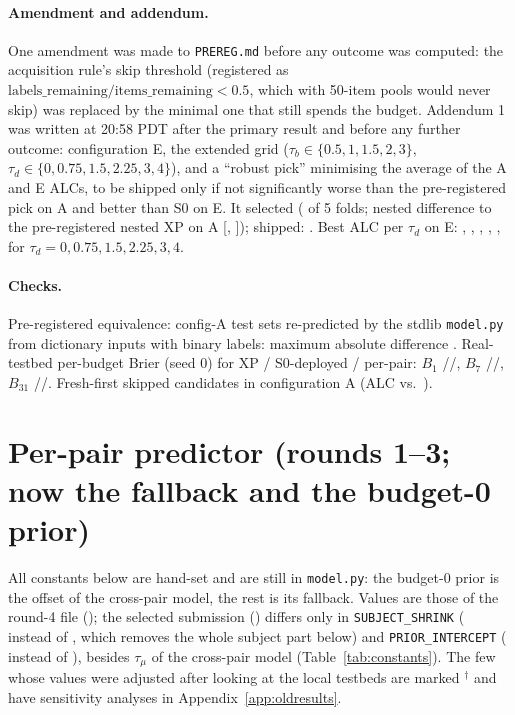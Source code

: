 \documentclass{article}
\begin{document}
\paragraph{Amendment and addendum.} One amendment was made to \texttt{PREREG.md} before any outcome was computed: the acquisition rule's skip threshold (registered as $\text{labels\_remaining}/\text{items\_remaining}<0.5$, which with 50-item pools would never skip) was replaced by the minimal one that still spends the budget. Addendum 1 was written at 20:58 PDT after the primary result and before any further outcome: configuration E, the extended grid ($\tau_b\in\{0.5,1,1.5,2,3\}$, $\tau_d\in\{0,0.75,1.5,2.25,3,4\}$), and a ``robust pick'' minimising the average of the A and E ALCs, to be shipped only if not significantly worse than the pre-registered pick on A and better than S0 on E. It selected \XpRobSameAsPrereg{} (\XpRobNFoldsSame{} of 5 folds; nested difference to the pre-registered nested XP on A \XpCARobVsPreMean{} [\XpCARobVsPreLo, \XpCARobVsPreHi]); shipped: \XpShipSource. Best ALC per $\tau_d$ on E: \XpProfItemZeroE, \XpProfItemZeroSevenFiveE, \XpProfItemOneFiveE, \XpProfItemTwoTwoFiveE, \XpProfItemThreeE, \XpProfItemFourE{} for $\tau_d=0,0.75,1.5,2.25,3,4$.

\paragraph{Checks.} Pre-registered equivalence: \XpEquivNTestsets{} config-A test sets re-predicted by the stdlib \texttt{model.py} from dictionary inputs with binary labels: maximum absolute difference \XpEquivMaxDiff. Real-testbed per-budget Brier (seed 0) for XP / S0-deployed / per-pair: $B_1$ \XpRealXpBOne/\XpRealShipGlobalBOne/\XpRealShipPerPairBOne, $B_7$ \XpRealXpBSeven/\XpRealShipGlobalBSeven/\XpRealShipPerPairBSeven, $B_{31}$ \XpRealXpBThirtyOne/\XpRealShipGlobalBThirtyOne/\XpRealShipPerPairBThirtyOne. Fresh-first skipped \XpAcqSkips{} candidates in configuration A (ALC \XpAcqFreshAlc{} vs.\ \XpAcqRandomAlc).


\section{Per-pair predictor (rounds 1--3; now the fallback and the budget-0 prior)}
\label{app:perpair}


All constants below are hand-set and are still in \texttt{model.py}: the budget-0 prior is the offset of the cross-pair model, the rest is its fallback. Values are those of the round-4 file (\FmShipId); the selected submission (\SelId) differs only in \texttt{SUBJECT\_SHRINK} (\SelSubjectShrink{} instead of \ShipSubjectShrink, which removes the whole subject part below) and \texttt{PRIOR\_INTERCEPT} (\SelIntercept{} instead of \ShipIntercept), besides $\tau_\mu$ of the cross-pair model (Table~\ref{tab:constants}). The few whose values were adjusted after looking at the local testbeds are marked $^\dagger$ and have sensitivity analyses in Appendix~\ref{app:oldresults}.
\end{document}
